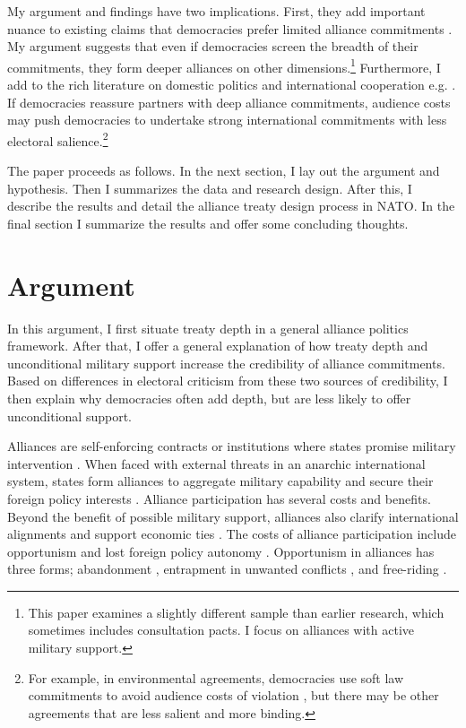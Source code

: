 \documentclass[12pt]{article}
\begin{document}
My argument and findings have two implications. 
First, they add important nuance to existing claims that democracies prefer limited alliance commitments \citep{Mattes2012, Chibaetal2015, FjelstulReiter2019}. 
My argument suggests that even if democracies screen the breadth of their commitments, they form deeper alliances on other dimensions.\footnote{This paper examines a slightly different sample than earlier research, which sometimes includes consultation pacts. I focus on alliances with active military support.}  
Furthermore, I add to the rich literature on domestic politics and international cooperation e.g. \citep{DownesRocke1995, Fearon1998, Leeds1999, MattesRodriguez2014}. 
If democracies reassure partners with deep alliance commitments, audience costs may push democracies to undertake strong international commitments with less electoral salience.\footnote{For example, in environmental agreements, democracies use soft law commitments to avoid audience costs of violation \citep{BoehmeltButkute2018}, but there may be other agreements that are less salient and more binding.} 


The paper proceeds as follows. 
In the next section, I lay out the argument and hypothesis. 
Then I summarizes the data and research design. 
After this, I describe the results and detail the alliance treaty design process in NATO.
In the final section I summarize the results and offer some concluding thoughts. 


\section{Argument}


In this argument, I first situate treaty depth in a general alliance politics framework.  
After that, I offer a general explanation of how treaty depth and unconditional military support increase the credibility of alliance commitments. 
Based on differences in electoral criticism from these two sources of credibility, I then explain why democracies often add depth, but are less likely to offer unconditional support. 



Alliances are self-enforcing contracts or institutions where states promise military intervention \citep{Leedsetal2002, Morrow2000}. 
When faced with external threats in an anarchic international system, states form alliances to aggregate military capability and secure their foreign policy interests \citep{Altfield1984, Smith1995, Snyder1997, FordhamPoast2014}.
Alliance participation has several costs and benefits.
Beyond the benefit of possible military support, alliances also clarify international alignments \citep{Snyder1990} and support economic ties \citep{Gowa1995, Li2003, Long2003, Fordham2010, WolfordKim2017}.  
The costs of alliance participation include opportunism and lost foreign policy autonomy \citep{Altfield1984, Morrow2000, Johnson2015}. 
Opportunism in alliances has three forms; abandonment \citep{Leeds2003a, BerkemeierFuhrmann2018}, entrapment in unwanted conflicts \citep{Snyder1984}, and free-riding \citep{Morrow2000}.
\end{document}
